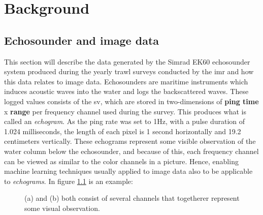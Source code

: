 \chapter{Background}
\section{Echosounder and image data}
    This section will describe the data generated by the Simrad EK60 echosounder system produced during the yearly trawl surveys conducted by the \gls{imr}\cite{johnsen2017collective} and how this data relates to image data. Echosounders are maritime instruments which induces acoustic waves into the water and logs the backscattered waves\cite{brautaset2020acoustic}. These logged values consists of the \gls{sv}, which are stored in two-dimensions of \textbf{ping time} x \textbf{range} per frequency channel used during the survey. This produces what is called an \textit{echogram}. As the ping rate was set to 1Hz\cite{choi2021semi}, with a pulse duration of 1.024 milliseconds, the length of each pixel is 1 second horizontally and 19.2 centimeters vertically. These echograms represent some visible observation of the water column below the echosounder, and because of this, each frequency channel can be viewed as similar to the color channels in a picture. Hence, enabling machine learning techniques usually applied to image data also to be applicable to \textit{echograms}. In figure \ref{accoustic data and color channels fig} is an example:

    \begin{figure}[H]
        \centering
        
        
        
        
        \caption[Frequency channels and color channels]{(a) and (b) both consist of several channels that togetherer represent some visual observation.}
        \label{accoustic data and color channels fig}
        
        \end{figure}
    
